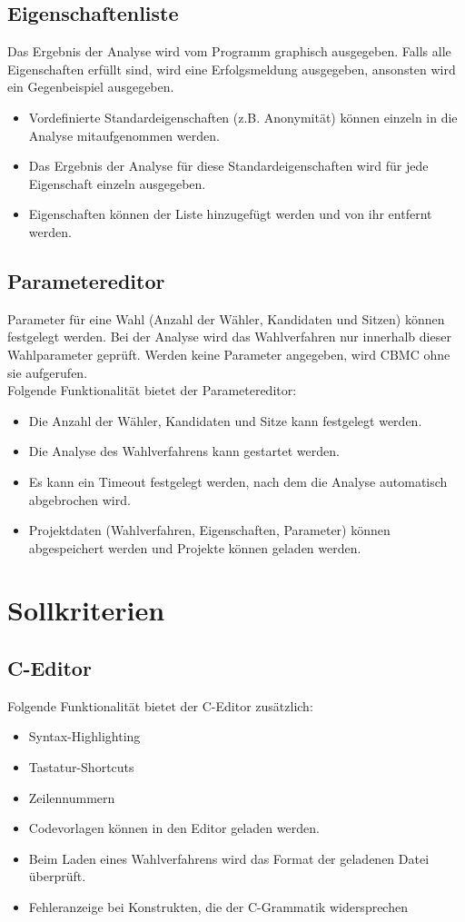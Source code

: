 \documentclass[a4paper]{scrreprt}
\begin{document}
\subsection{Eigenschaftenliste}
Das Ergebnis der Analyse wird vom Programm graphisch ausgegeben. Falls alle Eigenschaften erfüllt sind, wird eine Erfolgsmeldung ausgegeben, ansonsten wird ein Gegenbeispiel ausgegeben.
\begin{itemize}
	\item Vordefinierte Standardeigenschaften (z.B. Anonymität) können einzeln in die Analyse mitaufgenommen werden.
	\item Das Ergebnis der Analyse für diese Standardeigenschaften wird für jede Eigenschaft einzeln ausgegeben.
	\item Eigenschaften können der Liste hinzugefügt werden und von ihr entfernt werden.
\end{itemize}

\subsection{Parametereditor}
Parameter für eine Wahl (Anzahl der Wähler, Kandidaten und Sitzen) können festgelegt werden. Bei der Analyse wird das Wahlverfahren nur innerhalb dieser Wahlparameter geprüft. Werden keine Parameter angegeben, wird \ac{CBMC} ohne sie aufgerufen.\\
Folgende Funktionalität bietet der Parametereditor:
\begin{itemize}
	\item Die Anzahl der Wähler, Kandidaten und Sitze kann festgelegt werden.
	\item Die Analyse des Wahlverfahrens kann gestartet werden.
	\item Es kann ein Timeout festgelegt werden, nach dem die Analyse automatisch abgebrochen wird.
	\item Projektdaten (Wahlverfahren, Eigenschaften, Parameter) können abgespeichert werden und Projekte können geladen werden.
\end{itemize}




\section{Sollkriterien}
\subsection{C-Editor}
Folgende Funktionalität bietet der C-Editor zusätzlich:
\begin{itemize}
	\item Syntax-Highlighting
	\item Tastatur-Shortcuts
	\item Zeilennummern
	\item Codevorlagen können in den Editor geladen werden.
	\item Beim Laden eines Wahlverfahrens wird das Format der geladenen Datei überprüft.
	\item Fehleranzeige bei Konstrukten, die der C-Grammatik widersprechen
\end{itemize}
\end{document}
